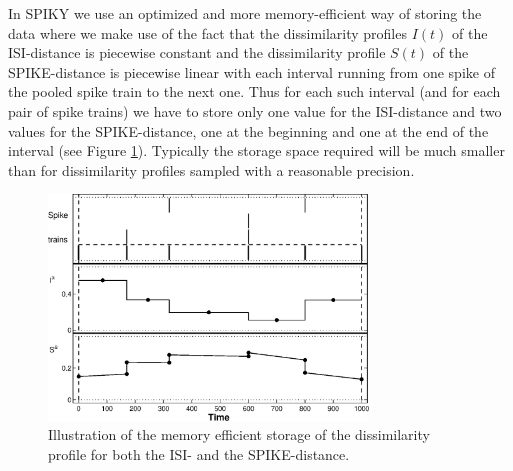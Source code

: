 \documentclass[10pt,twocolumn]{elsart5p}
\begin{document}
In SPIKY we use an optimized and more memory-efficient way of storing the data where we make use of the fact that the dissimilarity profiles $I (t)$ of the ISI-distance is piecewise constant and the dissimilarity profile $S (t)$ of the SPIKE-distance is piecewise linear with each interval running from one spike of the pooled spike train to the next one. Thus for each such interval (and for each pair of spike trains) we have to store only one value for the ISI-distance and two values for the SPIKE-distance, one at the beginning and one at the end of the interval (see Figure \ref{fig:No-sampling}). Typically the storage space required will be much smaller than for dissimilarity profiles sampled with a reasonable precision.
%
%
\begin{figure}
    \includegraphics[width=85mm]{No_sampling.eps}
    \caption{\abb\label{fig:No-sampling} Illustration of the memory efficient storage of the dissimilarity profile for both the ISI- and the SPIKE-distance.}
\end{figure}
%
\end{document}
